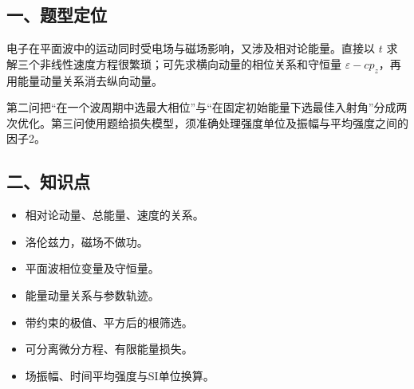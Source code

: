 \documentclass[12pt,a4paper,fontset=fandol]{ctexart}
\providecommand{\tightlist}{\setlength{\itemsep}{0pt}\setlength{\parskip}{0pt}}
\begin{document}
\begin{center}
\begin{minipage}{\linewidth}
\centering\begingroup
{}
\ifdim\wd\diagrambox>.88\linewidth
\sbox{\diagrambox}{\resizebox{.88\linewidth}{!}{\usebox{\diagrambox}}}
\fi
\ifdim\ht\diagrambox>.40\textheight
\resizebox{!}{.40\textheight}{\usebox{\diagrambox}}
\else\usebox{\diagrambox}\fi
\par{}
\endgroup\end{minipage}
\end{center}

\subsection{一、题型定位}\label{ux4e00ux9898ux578bux5b9aux4f4d-3}

电子在平面波中的运动同时受电场与磁场影响，又涉及相对论能量。直接以 \(t\)
求解三个非线性速度方程很繁琐；可先求横向动量的相位关系和守恒量
\(\varepsilon-cp_z\)，再用能量动量关系消去纵向动量。

第二问把``在一个波周期中选最大相位''与``在固定初始能量下选最佳入射角''分成两次优化。第三问使用题给损失模型，须准确处理强度单位及振幅与平均强度之间的因子2。

\subsection{二、知识点}\label{ux4e8cux77e5ux8bc6ux70b9-3}

\begin{itemize}
\tightlist
\item
  相对论动量、总能量、速度的关系。
\item
  洛伦兹力，磁场不做功。
\item
  平面波相位变量及守恒量。
\item
  能量动量关系与参数轨迹。
\item
  带约束的极值、平方后的根筛选。
\item
  可分离微分方程、有限能量损失。
\item
  场振幅、时间平均强度与SI单位换算。
\end{itemize}
\end{document}
